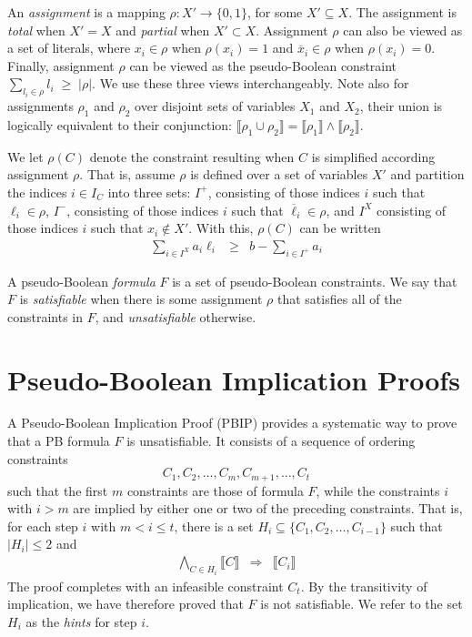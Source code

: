 \documentclass{easychair}
\renewcommand{\obar}[1]{\overline{#1}}
\newcommand{\lit}{\ell}
\newcommand{\assign}{\rho}
\newcommand{\indices}{I}
\newcommand{\imply}{\Rightarrow}
\newcommand{\func}[1]{\llbracket#1\rrbracket}
\begin{document}
An {\em assignment} is a mapping $\assign : X' \rightarrow \{0,1\}$,
for some $X' \subseteq X$.  The assignment is {\em total} when $X' =
X$ and {\em partial} when $X' \subset X$.  Assignment $\assign$ can
also be viewed as a set of literals, where $x_i \in \assign$ when
$\assign(x_i) = 1$ and $\obar{x}_i \in \assign$ when $\assign(x_i) = 0$.
Finally, assignment $\assign$ can be viewed as the
pseudo-Boolean constraint $\sum_{l_i \in \assign} l_i \;\geq\;| \assign |$.
We use these three views interchangeably.  Note also for
assignments $\assign_1$ and $\assign_2$ over disjoint sets of
variables $X_1$ and $X_2$, their union is logically equivalent to
their conjunction: $\func{\assign_1 \cup \assign_2} = \func{\assign_1}
\land \func{\assign_2}$.

We let $\assign(C)$ denote the constraint resulting when $C$ is
simplified according assignment $\assign$.  That is, assume $\assign$ is defined over a set of variables $X'$ and
partition the indices $i \in \indices_C$ into
three sets:
$I^{+}$, consisting of those indices $i$ such that $\lit_{i} \in \assign$,
$I^{-}$, consisting of those indices $i$ such that $\obar{\lit}_{i} \in \assign$,
and $I^{X}$ consisting of those indices $i$ such that $x_i \not \in X'$.
With this, $\assign(C)$ can be written
\begin{eqnarray}
\sum_{i \in I^{X}} a_{i} \lit_{i} & \geq & b - \sum_{i \in I^{+}} a_{i} \label{eqn:assigned}
\end{eqnarray}

A pseudo-Boolean {\em formula} $F$ is a set of pseudo-Boolean
constraints.  We say that $F$ is {\em satisfiable} when there is some
assignment $\assign$ that satisfies all of the constraints in $F$, and
{\em unsatisfiable} otherwise.  


\section{Pseudo-Boolean Implication Proofs}

A Pseudo-Boolean Implication Proof (PBIP) provides a systematic way to
prove that a PB formula $F$ is unsatisfiable.  It consists of a sequence of ordering constraints
\begin{displaymath}
  C_1, C_2, \ldots, C_m, C_{m+1}, \ldots, C_t
\end{displaymath}  
such that the first $m$ constraints are those of formula $F$, while the constraints $i$
with $i > m$ are implied by either one or two of the preceding constraints.
That is, for each step $i$ with $m < i \leq t$,
there is a set $H_i \subseteq \{C_1, C_2, \ldots, C_{i-1} \}$ such that $|H_i| \leq 2$ and
\begin{eqnarray}
\bigwedge_{C \in H_i} \func{C} & \imply & \func{C_i} \label{eqn:proofsequence}
\end{eqnarray}
The proof completes with an infeasible constraint $C_t$.
By the transitivity of implication, we have therefore proved that $F$ is not satisfiable.
We refer to the set $H_i$ as the {\em hints} for step $i$.
\end{document}
